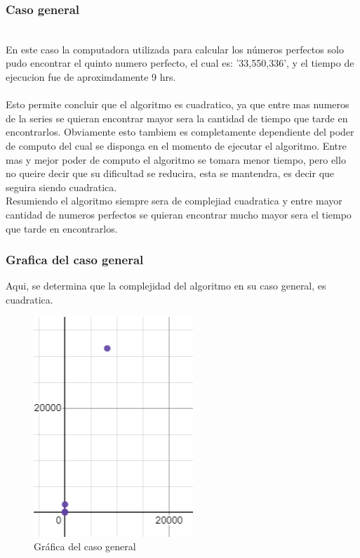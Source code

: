 \documentclass[12pt,twoside]{article}
\begin{document}
\subsubsection{Caso general}
\\
En este caso la computadora utilizada para calcular los números perfectos solo pudo encontrar el quinto numero perfecto, el cual es: '33,550,336', y el tiempo de ejecucion fue de aproximdamente 9 hrs.  
\\
\\
Esto permite concluir que el algoritmo es cuadratico, ya que entre mas numeros de la series se quieran encontrar mayor sera la cantidad de tiempo que tarde en encontrarlos. Obviamente esto tambiem es completamente dependiente del poder de computo del cual se disponga en el momento de ejecutar el algoritmo. Entre mas y mejor poder de computo el algoritmo se tomara menor tiempo, pero ello no queire decir que su dificultad se reducira, esta se mantendra, es decir que seguira siendo cuadratica.
\\
Resumiendo el algoritmo siempre sera de complejiad cuadratica y entre mayor cantidad de numeros perfectos se quieran encontrar mucho mayor sera el tiempo que tarde en encontrarlos.

\clearpage
\subsubsection{Grafica del caso general}
Aqui, se determina que la complejidad del algoritmo en su caso general, es cuadratica.
\begin{figure}[h!]
\centering
\includegraphics[scale=0.7]{grafper.png}
\caption{Gráfica del caso general}
\label{fig:universe}
\end{figure}
\end{document}
